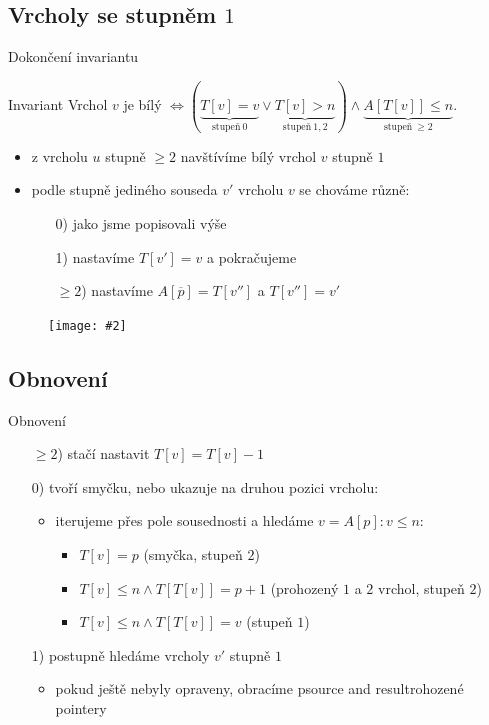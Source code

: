 \documentclass[czech]{beamer}
\makeatletter
\newcommand{\fitimage}[2][\@nil]{
	\begin{figure}
		\begin{adjustbox}{width=0.9\textwidth, totalheight=\textheight-2\baselineskip-2\baselineskip,keepaspectratio}
			\texttt{[image: \#2]}
		\end{adjustbox}
		\def\tmp{#1}%
	 \ifx\tmp\@nnil
			\else
			\caption{#1}
		\fi
	\end{figure}
}
\makeatother
\begin{document}
	\subsection{Vrcholy se stupněm $1$}
	\begin{frame}{Dokončení invariantu}
		\begin{block}{Invariant}
			Vrchol $v$ je bílý $\iff (\underbrace{T\left[v\right] = v}_{\text{stupeň}\ 0} \lor \underbrace{T[v] > n}_{\text{stupeň}\ 1, 2}) \land \underbrace{A[T[v]] \le n}_{\text{stupeň}\ \ge2}$.
		\end{block}
		\vfill
		\begin{itemize}
			\item z vrcholu $u$ stupně $\ge 2$ navštívíme bílý vrchol $v$ stupně $1$
			\item podle stupně jediného souseda $v'$ vrcholu $v$ se chováme různě:
			\begin{enumerate}
				\item[0)] jako jsme popisovali výše
				\item[1)] nastavíme $T[v'] = v$ a pokračujeme
				\item[$\ge 2$)] nastavíme $A[\overline{p}] = T[v'']$ a $T[v''] = v'$
			\end{enumerate}
		\end{itemize}
		\fitimage{images/deg1.png}
	\end{frame}

	\subsection{Obnovení}
	\begin{frame}{Obnovení}
		\hfill
		\begin{minipage}[t]{0.97\textwidth}
			\begin{enumerate}
				\item[$\ge 2$)] stačí nastavit $T[v] = T[v] - 1$
				\item[0)] tvoří smyčku, nebo ukazuje na druhou pozici vrcholu:
				\begin{itemize}
					\item iterujeme přes pole sousednosti a hledáme $v = A[p]: v \le n$:
					\begin{itemize}
						\item $T[v] = p$ (smyčka, stupeň $2$)
						\item $T[v] \le n \land T[T[v]] = p + 1$ (prohozený $1$ a $2$ vrchol, stupeň $2$)
						\item $T[v] \le n \land T[T[v]] = v$ (stupeň $1$)
					\end{itemize}
				\end{itemize}
				\item[1)] postupně hledáme vrcholy $v'$ stupně $1$
				\begin{itemize}
					\item pokud ještě nebyly opraveny, obracíme psource and resultrohozené pointery
				\end{itemize}
			\end{enumerate}
		\end{minipage}
	\end{frame}
\end{document}

